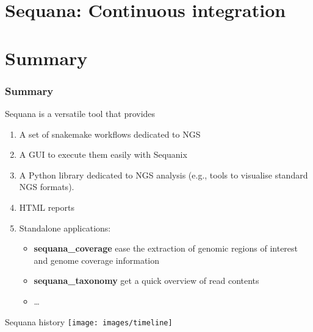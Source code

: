 \documentclass{beamer}
\begin{document}
 

\section{Sequana: Continuous integration}


\section{Summary}

\begin{frame}
 \frametitle{Summary}
Sequana is a versatile tool that provides

\begin{enumerate}
 \item A set of snakemake workflows dedicated to NGS 
 \item A GUI to execute them easily with Sequanix
 \item A Python library dedicated to NGS analysis (e.g., tools to visualise standard NGS formats).
 \item HTML reports
 \item Standalone applications:
 \begin{itemize}
    \item \textbf{sequana\_coverage} ease the extraction of genomic regions of interest and genome coverage information
    \item \textbf{sequana\_taxonomy} get a quick overview of read contents
    \item \dots
 \end{itemize}
\end{enumerate}
\end{frame}

\begin{frame}{Sequana history}
    \texttt{[image: images/timeline]}
\end{frame}
\end{document}
